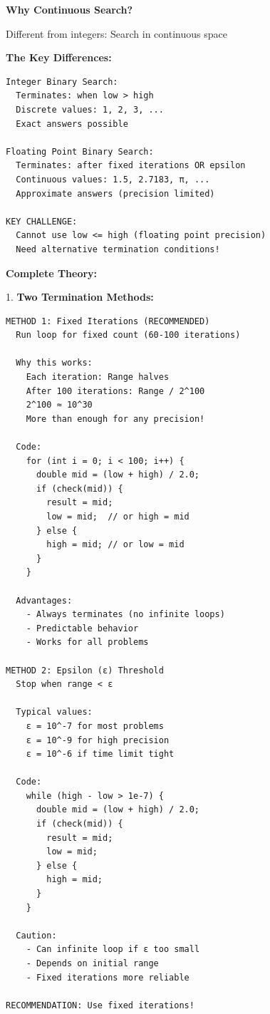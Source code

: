 \documentclass[11pt,a4paper,oneside]{book}
\begin{document}
\begin{tcolorbox}[
    enhanced,breakable,
    colback=white,
    colframe=deepblue,
    boxrule=1.5pt,
    arc=3mm,
    title=\textbf{Working with Real Numbers}
]
\textbf{Why Continuous Search?}

Different from integers: Search in continuous space

\textbf{The Key Differences:}
\begin{verbatim}
Integer Binary Search:
  Terminates: when low > high
  Discrete values: 1, 2, 3, ...
  Exact answers possible
  
Floating Point Binary Search:
  Terminates: after fixed iterations OR epsilon
  Continuous values: 1.5, 2.7183, π, ...
  Approximate answers (precision limited)
  
KEY CHALLENGE:
  Cannot use low <= high (floating point precision)
  Need alternative termination conditions!
\end{verbatim}

\textbf{Complete Theory:}

1. \textbf{Two Termination Methods:}
\begin{verbatim}
METHOD 1: Fixed Iterations (RECOMMENDED)
  Run loop for fixed count (60-100 iterations)
  
  Why this works:
    Each iteration: Range halves
    After 100 iterations: Range / 2^100
    2^100 ≈ 10^30
    More than enough for any precision!
  
  Code:
    for (int i = 0; i < 100; i++) {
      double mid = (low + high) / 2.0;
      if (check(mid)) {
        result = mid;
        low = mid;  // or high = mid
      } else {
        high = mid; // or low = mid
      }
    }
  
  Advantages:
    - Always terminates (no infinite loops)
    - Predictable behavior
    - Works for all problems

METHOD 2: Epsilon (ε) Threshold
  Stop when range < ε
  
  Typical values:
    ε = 10^-7 for most problems
    ε = 10^-9 for high precision
    ε = 10^-6 if time limit tight
  
  Code:
    while (high - low > 1e-7) {
      double mid = (low + high) / 2.0;
      if (check(mid)) {
        result = mid;
        low = mid;
      } else {
        high = mid;
      }
    }
  
  Caution:
    - Can infinite loop if ε too small
    - Depends on initial range
    - Fixed iterations more reliable

RECOMMENDATION: Use fixed iterations!
\end{verbatim}


\end{tcolorbox}
\end{document}
